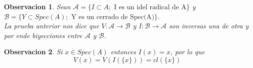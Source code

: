 \documentclass{article}
\newtheorem{observacion}{Observacion}
\begin{document}
\begin{observacion}
    Sean $\mathcal{A} = \{I \subset A; \mbox{ I es un idel radical de A}\}$
    y $\mathcal{B} = \{Y \subset Spec(A); \mbox{ Y es un cerrado de Spec(A)}\}$.\\
    La prueba anterior nos dice que $V:\mathcal{A} \rightarrow \mathcal{B}$ y 
    $I: \mathcal{B} \rightarrow \mathcal{A}$ son inversas una de otra y por ende
    biyecciones entre $\mathcal{A}$ y $\mathcal{B}$.
\end{observacion}

\begin{observacion}
    Si $x\in Spec(A)$ entonces $I({x})=x$, por lo que
    $$V(x)=V(I(\{x\}))=cl(\{x\})$$
\end{observacion}
\end{document}
